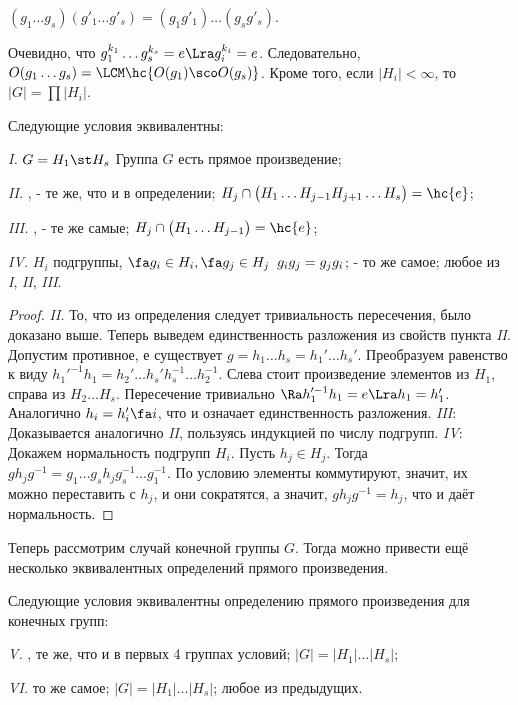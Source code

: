 \documentclass[a4paper]{article}
\begin{document}
\begin{imp}
$(g_1 \ldots g_s)(g'_1\ldots g'_s) = (g_1g'_1)\ldots(g_sg'_s)$.
\end{imp}

Очевидно, что $g_1^{k_1}\ldots g_s^{k_s}=e \Lra g_i^{k_i}=e$. Следовательно,  $O(g_1\ldots g_s) =
\LCM\hc{O(g_1) \sco O(g_s)}$. Кроме того, если $|H_i| < \infty$, то $|G| = \prod |H_i|$.

\begin{stm}
Следующие условия эквивалентны:

\emph{I.} $G = H_1 \st H_s$ Группа $G$ есть прямое произведение;

\emph{II.} ,  - те же, что и в определении;  $H_j \cap \bigl(H_1 \ldots H_{j-1} H_{j+1} \ldots H_s \bigr) = \hc{e}$;

\emph{III.} ,  - те же самые;  $H_j \cap \bigl(H_1 \ldots H_{j-1}\bigr) = \hc{e}$;

\emph{IV.}  $H_i$ подгруппы, $\fa g_i \in H_i, \fa g_j \in H_j \;\; g_i g_j = g_j g_i$;  - то же самое; 
любое из \emph{I}, \emph{II}, \emph{III}.
\end{stm}

\begin{proof}
\emph{II.} То, что из определения следует тривиальность пересечения, было доказано выше.  Теперь выведем
единственность разложения из свойств пункта \emph{II}. Допустим противное, е существует $g=h_1 \ldots
h_s = h_1' \ldots h_s'$. Преобразуем равенство к виду $h_1'^{-1}h_1=h_2' \ldots h_s'h_s^{-1} \ldots
h_2^{-1}$. Слева стоит произведение элементов из $H_1$, справа из $H_2 \ldots H_s$. Пересечение
тривиально $ \Ra h_1'^{-1}h_1=e \Lra h_1=h_1'$. Аналогично $h_i=h_i' \fa i$, что и означает единственность
разложения. \emph{III}: Доказывается аналогично \emph{II}, пользуясь индукцией по числу подгрупп.
\emph{IV}: Докажем нормальность подгрупп $H_i$. Пусть $h_j \in H_j$. Тогда $g h_j g^{-1} = g_1 \ldots g_s
h_j g_s^{-1} \ldots g_1^{-1}$. По условию элементы коммутируют, значит, их можно переставить с $h_j$, и они
сократятся, а значит, $gh_jg^{-1}=h_j$, что и даёт нормальность.
\end{proof}

Теперь рассмотрим случай конечной группы $G$. Тогда можно привести ещё несколько эквивалентных  определений
прямого произведения.

\begin{stm}
Следующие условия эквивалентны определению прямого произведения для конечных групп:

\emph{V.} ,  те же, что и в первых 4 группах условий;  $|G|=|H_1| \ldots |H_s|$;

\emph{VI.}  то же самое;  $|G|=|H_1|\ldots|H_s|$;  любое из предыдущих.
\end{stm}
\end{document}
